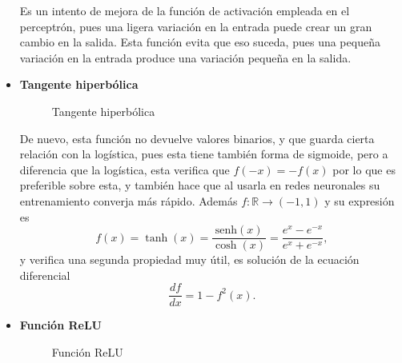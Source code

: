 \begin{itemize}
				Es un intento de mejora de la función de activación empleada en el perceptrón, pues una ligera variación en la entrada puede crear un gran cambio en la salida. Esta función evita que eso suceda, pues una pequeña variación en la entrada produce una variación pequeña en la salida. 
				
				\item \textbf{Tangente hiperbólica}
				\begin{figure}[!h]
					\centering
					\caption{Tangente hiperbólica}
					\label{fig:funcion_tanh}
				\end{figure}
				
				De nuevo, esta función no devuelve valores binarios, y que guarda cierta relación con la logística, pues esta tiene también forma de sigmoide, pero a diferencia que la logística, esta verifica que $f(-x) = -f(x)$ por lo que es preferible sobre esta, y también hace que al usarla en redes neuronales su entrenamiento converja más rápido. Además $f: \mathbb{R} \longrightarrow (-1, 1)$ y su expresión es
				$$
				f(x) = \tanh(x) = \frac{\text{senh}(x)}{\cosh(x)} = \frac{e^x - e^{-x}}{e^x + e^{-x}}, 
				$$
				y verifica una segunda propiedad muy útil, es solución de la ecuación diferencial
				$$
				\frac{df}{dx} = 1 - f^2(x). 
				$$
				
				\item \textbf{Función ReLU}
				
				\begin{figure}[H]
					\centering
					\caption{Función ReLU}
					\label{fig:funcion_relu}
				\end{figure}
				

\end{itemize}
